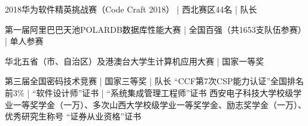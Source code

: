 \documentclass[zh]{resume}
\begin{document}
\begin{entries}

    {2018华为软件精英挑战赛（Code Craft 2018） | 西北赛区44名 | 队长}%

    {第一届阿里巴巴天池POLARDB数据库性能大赛 | 全国百强（共1653支队伍参赛） | 单人参赛}%

    {华北五省（市、自治区）及港澳台大学生计算机应用大赛 | 国家一等奖 }%
	

    {第三届全国密码技术竞赛 | 国家三等奖 | 队长 \quad {}}%
    {“CCF第7次CSP能力认证”全国排名前3\% | “软件设计师”证书 | “系统集成管理工程师”证书}
    {西安电子科技大学校级学业一等奖学金（一万）、多次山西大学校级学业一等奖学金、励志奖学金（一万）、优秀研究生称号}
    {“证券从业资格”证书}
\end{entries}
\end{document}
